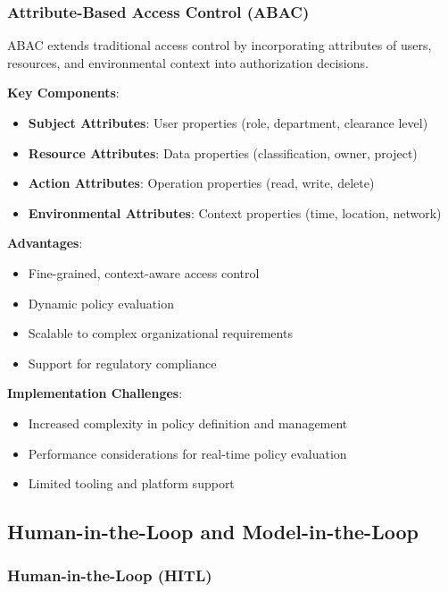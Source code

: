 \subsubsection{Attribute-Based Access Control (ABAC)}

ABAC \cite{hu2014guide} extends traditional access control by incorporating attributes of users, resources, and environmental context into authorization decisions.

\textbf{Key Components}:
\begin{itemize}
    \item \textbf{Subject Attributes}: User properties (role, department, clearance level)
    \item \textbf{Resource Attributes}: Data properties (classification, owner, project)
    \item \textbf{Action Attributes}: Operation properties (read, write, delete)
    \item \textbf{Environmental Attributes}: Context properties (time, location, network)
\end{itemize}

\textbf{Advantages}:
\begin{itemize}
    \item Fine-grained, context-aware access control
    \item Dynamic policy evaluation
    \item Scalable to complex organizational requirements
    \item Support for regulatory compliance
\end{itemize}

\textbf{Implementation Challenges}:
\begin{itemize}
    \item Increased complexity in policy definition and management
    \item Performance considerations for real-time policy evaluation
    \item Limited tooling and platform support
\end{itemize}

\subsection{Human-in-the-Loop and Model-in-the-Loop}
\label{subsec:hitl-mitl}

\subsubsection{Human-in-the-Loop (HITL)}

